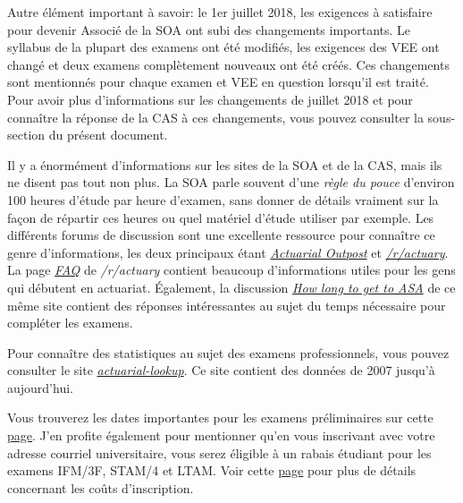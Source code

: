 Autre élément important à savoir: le 1er juillet 2018, les exigences à satisfaire pour devenir Associé de la SOA ont subi des changements importants. Le syllabus de la plupart des examens ont été modifiés, les exigences des VEE ont changé et deux examens complètement nouveaux ont été créés. Ces changements sont mentionnés pour chaque examen et VEE en question lorsqu'il est traité. Pour avoir plus d'informations sur les changements de juillet 2018 et pour connaître la réponse de la CAS à ces changements, vous pouvez consulter la sous-section  du présent document. \vspace{\baselineskip}

Il y a énormément d'informations sur les sites de la SOA et de la CAS, mais ils ne disent pas tout non plus. La SOA parle souvent  d'une \emph{règle du pouce} d'environ 100 heures d'étude par heure d'examen, sans donner de détails vraiment sur la façon de répartir ces heures ou quel matériel d'étude utiliser par exemple. Les différents forums de discussion sont une excellente ressource pour connaître ce genre d'informations, les deux principaux étant \href{http://www.actuarialoutpost.com/}{\emph{Actuarial Outpost}} et \href{https://www.reddit.com/r/actuary}{\emph{/r/actuary}}. La page \href{https://www.reddit.com/r/actuary/wiki/index#wiki_the_frequently_asked_questions_.28faqs.29}{\emph{FAQ}} de \emph{/r/actuary} contient beaucoup d'informations utiles pour les gens qui débutent en actuariat. Également, la discussion \href{https://www.reddit.com/r/actuary/comments/1enzdd/how_long_to_get_to_asa_is_two_years_possible/}{\emph{How long to get to ASA}} de ce même site contient des réponses intéressantes au sujet du temps nécessaire pour compléter les examens. \vspace{\baselineskip}

Pour connaître des statistiques au sujet des examens professionnels, vous pouvez consulter le site \href{http://actuarial-lookup.com/}{\emph{actuarial-lookup}}. Ce site contient des données de 2007 jusqu'à aujourd'hui. \vspace{\baselineskip}

Vous trouverez les dates importantes pour les examens préliminaires sur cette \href{https://www.soa.org/Education/Exam-Req/Exam-Day-Info/edu-2018-cbt-test-schedule.aspx}{page}. J'en profite également pour mentionner qu'en vous inscrivant avec votre adresse courriel universitaire, vous serez éligible à un rabais étudiant pour les examens IFM/3F, STAM/4 et LTAM. Voir cette \href{https://soa.org/Education/Exam-Req/Syllabus-Study-Materials/Exam-and-Module-Fees.aspx}{page} pour plus de détails concernant les coûts d'inscription. \vspace{\baselineskip}


